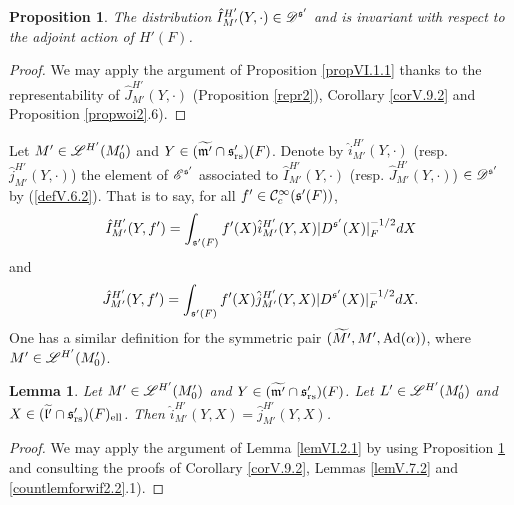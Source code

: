 \documentclass[a4paper]{amsart}
\newcommand{\mse}{\mathscr{E}}\newcommand{\msf}{\mathscr{F}}\newcommand{\msg}{\mathscr{G}}\newcommand{\msh}{\mathscr{H}}
\newcommand{\fm}{{\mathfrak{m}}} \newcommand{\fn}{{\mathfrak{n}}}\newcommand{\fo}{{\mathfrak{o}}} \newcommand{\fp}{{\mathfrak{p}}}
\newcommand{\wt}{\widetilde}                        \newcommand{\wh}{\widehat}                      \newcommand{\wpair}[1]{\left\{{#1}\right\}}
\newtheorem{lem}[thm]{Lemma}
\newtheorem{prop}[thm]{Proposition}
\theoremstyle{definition}
\theoremstyle{remark}
\numberwithin{equation}{subsection}
\begin{document}
\begin{prop}\label{propVI.1.2}
The distribution $\hat{I}_{M'}^{H'}(Y, \cdot)\in\mathscr{D}^{{\mathfrak{s}}'}$ and is invariant with respect to the adjoint action of $H'(F)$. 
\end{prop}

\begin{proof}
We may apply the argument of Proposition \ref{propVI.1.1} thanks to the representability of $\hat{J}_{M'}^{H'}(Y, \cdot)$ (Proposition \ref{repr2}), Corollary \ref{corV.9.2} and Proposition \ref{propwoi2}.6). 
\end{proof}

Let $M'\in\mathscr{L}^{H'}(M'_0)$ and $Y\in(\wt{\fm'}\cap\fs'_\rs)(F)$. Denote by $\hat{i}_{M'}^{H'}(Y, \cdot)$ (resp. $\hat{j}_{M'}^{H'}(Y, \cdot)$) the element of $\mse^{\fs'}$ associated to $\hat{I}_{M'}^{H'}(Y, \cdot)$ (resp. $\hat{J}_{M'}^{H'}(Y, \cdot)$) $\in\mathscr{D}^{{\mathfrak{s}}'}$ by (\ref{defV.6.2}). That is to say, for all $f'\in{\mathcal {C}}_c^\infty({\mathfrak{s}}'(F))$, 
$$ \hat{I}_{M'}^{H'}(Y, f')=\int_{{\mathfrak{s}}'(F)} f'(X) \hat{i}_{M'}^{H'}(Y, X) |D^{{\mathfrak{s}}'}(X)|_F^{-1/2} dX $$
and
$$ \hat{J}_{M'}^{H'}(Y, f')=\int_{{\mathfrak{s}}'(F)} f'(X) \hat{j}_{M'}^{H'}(Y, X) |D^{{\mathfrak{s}}'}(X)|_F^{-1/2} dX. $$
One has a similar definition for the symmetric pair $(\wt{M'}, M', \Ad(\alpha))$, where $M'\in\mathscr{L}^{H'}(M'_0)$. 

\begin{lem}\label{lemVI.2.2}
Let $M'\in\mathscr{L}^{H'}(M'_0)$ and $Y\in(\wt{\fm'}\cap\fs'_\rs)(F)$. Let $L'\in\mathscr{L}^{H'}(M'_0)$ and $X\in(\wt{\fl'}\cap\fs'_\rs)(F)_\el$. Then $\hat{i}_{M'}^{H'}(Y, X)=\hat{j}_{M'}^{H'}(Y, X)$. 
\end{lem}

\begin{proof}
We may apply the argument of Lemma \ref{lemVI.2.1} by using Proposition \ref{propVI.1.2} and consulting the proofs of Corollary \ref{corV.9.2}, Lemmas \ref{lemV.7.2} and \ref{countlemforwif2.2}.1). 
\end{proof}
\end{document}
